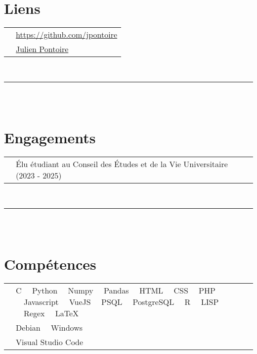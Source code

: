 \documentclass[oneside]{article}
\begin{document}
{\begin{minipage}[t][\textheight-2\fboxsep-2\fboxrule][t]{\dimexpr0.30\textwidth-2\fboxrule-2\fboxsep\relax}
        \section*{\large Liens}
        \vspace{.2cm}
        \begin{tabular}{cl}
            \vspace{.3cm}
            \faGithub{}   & \href{https://github.com/jpontoire}{https://github.com/jpontoire} \\
            \faLinkedin{} & \href{https://www.linkedin.com/in/julien-pontoire-0a50a42b1/}{Julien Pontoire} \\
        \end{tabular}
        \vspace{8pt} \\
        \rule{\linewidth}{0.4pt} \\
        \vspace{8pt} \\

        \section*{\large Engagements}
        \vspace{.2cm}
        \begin{tabularx}{\textwidth}{cY}
            & Élu étudiant au Conseil des Études et de la Vie Universitaire (2023 - 2025)
        \end{tabularx}
        \vspace{8pt} \\
        \rule{\linewidth}{0.4pt} \\
        \vspace{8pt} \\
        \section*{\large Compétences}
        \vspace{.2cm}
        \begin{tabularx}{\textwidth}{cY}
            \vspace{.5cm}
            \faCode{}        & C \ \ Python \ \ Numpy \ \ Pandas \ \ HTML \ \ CSS \ \ PHP \ \ Javascript \ \ VueJS \ \ PSQL \ \ PostgreSQL \ \ R \ \ LISP \ \ Regex \ \ LaTeX \\
            \vspace{.5cm}
            \faCogs{}        & Debian \ \ Windows \\
            \vspace{.5cm}
            \faLaptopCode{}  & Visual Studio Code
            

\end{tabularx}
\end{minipage}}
\end{document}
